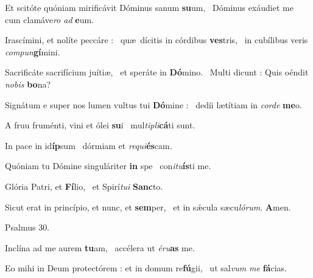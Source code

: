 \documentclass[12pt]{article} %
\def\noinitial{%
\gresetfirstlineaboveinitial{\textcolor{benred8}{\small \textsc{\textbf{}}}}{\textcolor{benred8}{\small \textsc{\textbf{}}}}
\setspaceafterinitial{0pt plus 0em minus 0em}%
\setspacebeforeinitial{0pt plus 0em minus 0em}%
\relax %
}
\newenvironment{psalmtext}{\leftskip 0.25in}{\vspace{1 mm}}
\let\oldgresixstar\gresixstar
\renewcommand{\gresixstar}{\textcolor{benred8}{\oldgresixstar}}
\let\oldgredagger\gredagger
\renewcommand{\gredagger}{\textcolor{benred8}{\oldgredagger}}
\begin{document}
\begin{pages}
\begin{Leftside}
\begin{psalmtext}
Et scit\'{o}te qu\'{o}niam mirific\'{a}vit D\'{o}minus sanum \textbf{su}um, \gresixstar\ D\'{o}minus ex\'{a}udiet me cum clam\'{a}ve\emph{ro ad} \textbf{e}um.

Irasc\'{i}mini, et nol\'{i}te pecc\'{a}re : \gredagger\ qu\ae\ d\'{i}citis in c\'{o}rdibus \textbf{ves}tris, \gresixstar\ in cub\'{i}libus veris \emph{compun}\textbf{g\'{i}}mini.

Sacrific\'{a}te sacrif\'{i}cium ju\'{i}ti\ae , \gredagger\ et sper\'{a}te  in \textbf{D\'{o}}mino. \gresixstar\ Multi dicunt : Quis o\'{e}ndit \emph{nobis} \textbf{bo}na?

Sign\'{a}tum e super nos lumen vultus tui \textbf{D\'{o}}mine : \gresixstar\ ded\'{i}i l\ae t\'{i}tiam in \emph{corde} \textbf{me}o.

A fruu frum\'{e}nti, vini et \'{o}lei \textbf{su}i \gresixstar\ mul\emph{tipli}\textbf{c\'{a}}ti sunt.

In pace in id\textbf{\'{i}p}sum \gresixstar\ d\'{o}rmiam et \emph{requi}\textbf{\'{e}s}cam.

Qu\'{o}niam tu D\'{o}mine singul\'{a}riter \textbf{in} spe \gresixstar\ con\emph{itu}\textbf{\'{i}s}ti me.

Gl\'{o}ria Patri, et \textbf{F\'{i}}lio, \gresixstar\ et Spir\'{i}\emph{tui} \textbf{Sanc}to.

Sicut erat in princ\'{i}pio, et nunc, et \textbf{sem}per, \gresixstar\ et in s\'{\ae}cula s\ae cu\emph{l\'{o}rum}. \textbf{A}men.

\end{psalmtext}

\pend\pstart


{
\centering
\textcolor{benred8}{Psalmus 30.}

}

\pend\pstart

{\noinitial
{}

}

\pend\pstart

\begin{psalmtext}
Incl\'{i}na ad me aurem \textbf{tu}am, \gresixstar\ acc\'{e}lera ut \emph{\'{e}ru}\textbf{as} me.

Eo mihi in Deum protect\'{o}rem : et in domum re\textbf{f\'{u}}gii, \gresixstar\ ut sal\emph{vum me} \textbf{f\'{a}}cias.


\end{psalmtext}
\end{Leftside}
\end{pages}
\end{document}

